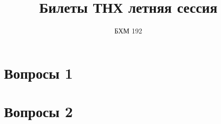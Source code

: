\documentclass{article}
\title{Билеты ТНХ летняя сессия}
\author{БХМ 192}
\date{}
\begin{document}
\maketitle
\tableofcontents

\section{Вопросы 1}



































































\section{Вопросы 2}
\end{document}
